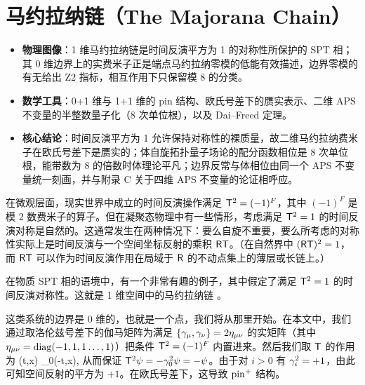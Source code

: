\section{马约拉纳链（The Majorana Chain）}\label{maj}

\begin{keytakeaways}
\begin{itemize}[leftmargin=1.6em,itemsep=0.2em,topsep=0.2em]
  \item \textbf{物理图像}：1 维马约拉纳链是时间反演平方为 1 的对称性所保护的 SPT 相；其 0 维边界上的实费米子正是端点马约拉纳零模的低能有效描述，边界零模的有无给出 Z2 指标，相互作用下只保留模 8 的分类。
  \item \textbf{数学工具}：0+1 维与 1+1 维的 pin 结构、欧氏号差下的赝实表示、二维 APS 不变量的半整数量子化（8 次单位根），以及 Dai--Freed 定理。
  \item \textbf{核心结论}：时间反演平方为 1 允许保持对称性的裸质量，故二维马约拉纳费米子在欧氏号差下是赝实的；体自旋拓扑量子场论的配分函数相位是 8 次单位根，能带数为 8 的倍数时体理论平凡；边界反常与体相位由同一个 APS 不变量统一刻画，并与附录 C 关于四维 APS 不变量的论证相呼应。
\end{itemize}
\end{keytakeaways}

在微观层面，现实世界中成立的时间反演操作满足 ${\sf T}^2=(-1)^F$，其中 $(-1)^F$ 是模 2 数费米子的算子。但在凝聚态物理中有一些情形，考虑满足 ${\sf T}^2=1$ 的时间反演对称是自然的。这通常发生在两种情况下：要么自旋不重要，要么所考虑的对称性实际上是时间反演与一个空间坐标反射的乘积 ${\sf{RT}}$。（在自然界中 $({\sf{RT}})^2=1$，而 ${\sf{RT}}$ 可以作为时间反演作用在局域于 ${\sf R}$ 的不动点集上的薄层或长链上。）

在物质 SPT 相的语境中，有一个非常有趣的例子，其中假定了满足 ${\sf T}^2=1$ 的时间反演对称性。这就是 1 维空间中的马约拉纳链 \cite{FK}。

这类系统的边界是 0 维的，也就是一个点，我们将从那里开始。在本文中，我们通过取洛伦兹号差下的伽马矩阵为满足 $\{{\gamma}_\mu,{\gamma}_\nu\}=2\eta_{\mu\nu}$ 的实矩阵（其中 $\eta_{\mu\nu}={\mathrm{diag}}(-1,1,1\dots,1)$）把条件 ${\sf T}^2=(-1)^F$ 内置进来。然后我们取 ${\sf T}$ 的作用为
\be\label{horz}\psi(t,\vec x)
\to \pm \g_0\psi(-t,\vec x),\ee
从而保证 ${\sf T}^2\psi=-{\gamma}_0^2\psi=-\psi$。由于对 $i>0$ 有 ${\gamma}_i^2=+1$，由此可知空间反射的平方为 $+1$。在欧氏号差下，这导致 ${\mathrm{pin}}^+$ 结构。


